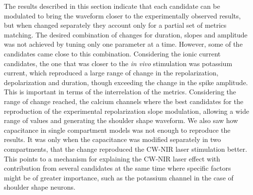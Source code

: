 The results described in this section indicate that each candidate can be modulated to bring the waveform closer to the experimentally observed results, but when changed separately they account only for a partial set of metrics matching. The desired combination of changes for duration, slopes and amplitude was not achieved by tuning only one parameter at a time. However, some of the candidates came close to this combination. Considering the ionic current candidates, the one that was closer to the \textit{in vivo} stimulation was potassium current, which reproduced a large range of change in the repolarization, depolarization and duration, though exceeding the change in the spike amplitude. This is important in terms of the interrelation of the metrics. Considering the range of change reached, the calcium channels where the best candidates for the reproduction of the experimental repolarization slope modulation, allowing a wide range of values and generating the shoulder shape waveform. We also saw how capacitance in single compartment models was not enough to reproduce the results. It was only when the capacitance was modified separately in two compartments, that the change reproduced the CW-NIR laser stimulation better. This points to a mechanism for explaining the CW-NIR laser effect with contribution from several candidates at the same time where specific factors might be of greater importance, such as the potassium channel in the case of shoulder shape neurons.


